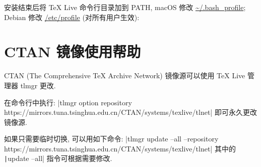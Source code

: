 安装结束后将 {\TeX}  Live 命令行目录加到 PATH, macOS 修改 \url{~/.bash_profile};
Debian 修改 \url{/etc/profile} (对所有用户生效):


\section{CTAN 镜像使用帮助}

CTAN (The Comprehensive TeX Archive Network) 镜像源可以使用 {\TeX} Live 管理器 tlmgr 更改.

在命令行中执行:
|tlmgr option repository https://mirrors.tuna.tsinghua.edu.cn/CTAN/systems/texlive/tlnet|
即可永久更改镜像源.

如果只需要临时切换, 可以用如下命令:
|tlmgr update --all --repository https://mirrors.tuna.tsinghua.edu.cn/CTAN/systems/texlive/tlnet|
其中的 \texttt|update --all| 指令可根据需要修改.
